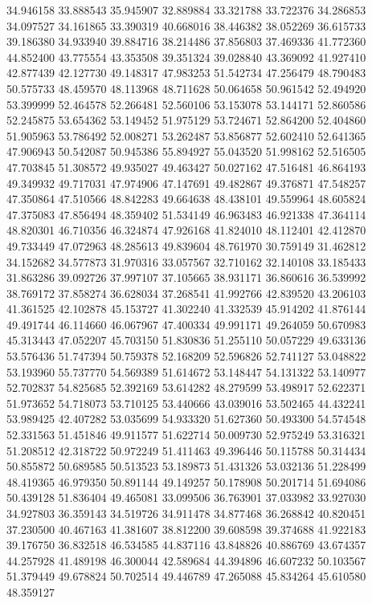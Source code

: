 34.946158
33.888543
35.945907
32.889884
33.321788
33.722376
34.286853
34.097527
34.161865
33.390319
40.668016
38.446382
38.052269
36.615733
39.186380
34.933940
39.884716
38.214486
37.856803
37.469336
41.772360
44.852400
43.775554
43.353508
39.351324
39.028840
43.369092
41.927410
42.877439
42.127730
49.148317
47.983253
51.542734
47.256479
48.790483
50.575733
48.459570
48.113968
48.711628
50.064658
50.961542
52.494920
53.399999
52.464578
52.266481
52.560106
53.153078
53.144171
52.860586
52.245875
53.654362
53.149452
51.975129
53.724671
52.864200
52.404860
51.905963
53.786492
52.008271
53.262487
53.856877
52.602410
52.641365
47.906943
50.542087
50.945386
55.894927
55.043520
51.998162
52.516505
47.703845
51.308572
49.935027
49.463427
50.027162
47.516481
46.864193
49.349932
49.717031
47.974906
47.147691
49.482867
49.376871
47.548257
47.350864
47.510566
48.842283
49.664638
48.438101
49.559964
48.605824
47.375083
47.856494
48.359402
51.534149
46.963483
46.921338
47.364114
48.820301
46.710356
46.324874
47.926168
41.824010
48.112401
42.412870
49.733449
47.072963
48.285613
49.839604
48.761970
30.759149
31.462812
34.152682
34.577873
31.970316
33.057567
32.710162
32.140108
33.185433
31.863286
39.092726
37.997107
37.105665
38.931171
36.860616
36.539992
38.769172
37.858274
36.628034
37.268541
41.992766
42.839520
43.206103
41.361525
42.102878
45.153727
41.302240
41.332539
45.914202
41.876144
49.491744
46.114660
46.067967
47.400334
49.991171
49.264059
50.670983
45.313443
47.052207
45.703150
51.830836
51.255110
50.057229
49.633136
53.576436
51.747394
50.759378
52.168209
52.596826
52.741127
53.048822
53.193960
55.737770
54.569389
51.614672
53.148447
54.131322
53.140977
52.702837
54.825685
52.392169
53.614282
48.279599
53.498917
52.622371
51.973652
54.718073
53.710125
53.440666
43.039016
53.502465
44.432241
53.989425
42.407282
53.035699
54.933320
51.627360
50.493300
54.574548
52.331563
51.451846
49.911577
51.622714
50.009730
52.975249
53.316321
51.208512
42.318722
50.972249
51.411463
49.396446
50.115788
50.314434
50.855872
50.689585
50.513523
53.189873
51.431326
53.032136
51.228499
48.419365
46.979350
50.891144
49.149257
50.178908
50.201714
51.694086
50.439128
51.836404
49.465081
33.099506
36.763901
37.033982
33.927030
34.927803
36.359143
34.519726
34.911478
34.877468
36.268842
40.820451
37.230500
40.467163
41.381607
38.812200
39.608598
39.374688
41.922183
39.176750
36.832518
46.534585
44.837116
43.848826
40.886769
43.674357
44.257928
41.489198
46.300044
42.589684
44.394896
46.607232
50.103567
51.379449
49.678824
50.702514
49.446789
47.265088
45.834264
45.610580
48.359127
